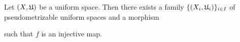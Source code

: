 \begin{corollary}\label{corollary:uniform_space_is_subspace_of_product_of_pseudometrizable_spaces}
Let $(X,{\mathfrak U})$ be a uniform space. Then there exists a family $\{(X_i,{\mathfrak U}_i)\}_{i\in I}$ of pseudometrizable uniform spaces and a morphism 
\begin{center}
\end{center}
such that $f$ is an injective map.
\end{corollary}

































